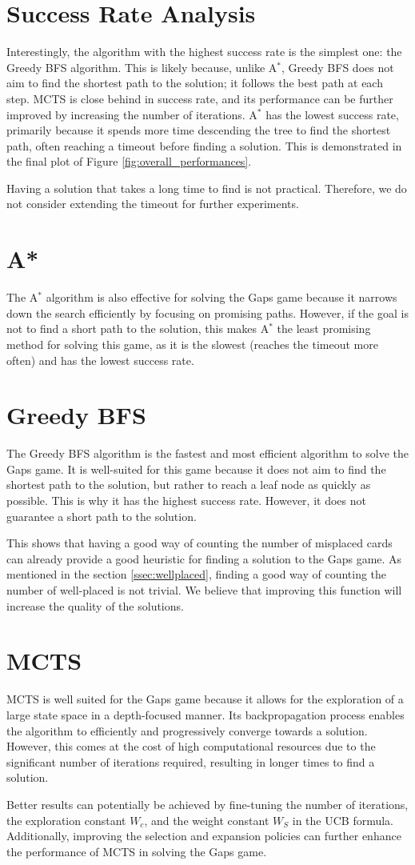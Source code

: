 \section{Success Rate Analysis}
Interestingly, the algorithm with the highest success rate is the simplest one: the Greedy BFS algorithm. This is likely because, unlike A$^*$, Greedy BFS does not aim to find the shortest path to the solution; it follows the best path at each step. MCTS is close behind in success rate, and its performance can be further improved by increasing the number of iterations. A$^*$ has the lowest success rate, primarily because it spends more time descending the tree to find the shortest path, often reaching a timeout before finding a solution. This is demonstrated in the final plot of Figure \ref{fig:overall_performances}.

Having a solution that takes a long time to find is not practical. Therefore, we do not consider extending the timeout for further experiments.

\section{A*}
The A$^*$ algorithm is also effective for solving the Gaps game because it narrows down the search efficiently by focusing on promising paths. However, if the goal is not to find a short path to the solution, this makes A$^*$ the least promising method for solving this game, as it is the slowest (reaches the timeout more often) and has the lowest success rate.

\section{Greedy BFS}
The Greedy BFS algorithm is the fastest and most efficient algorithm to solve the Gaps game. It is well-suited for this game because it does not aim to find the shortest path to the solution, but rather to reach a leaf node as quickly as possible. This is why it has the highest success rate. However, it does not guarantee a short path to the solution.

This shows that having a good way of counting the number of misplaced cards can already provide a good heuristic for finding a solution to the Gaps game. As mentioned in the section \ref{ssec:wellplaced}, finding a good way of counting the number of well-placed is not trivial. We believe that improving this function will increase the quality of the solutions.

\section{MCTS}
MCTS is well suited for the Gaps game because it allows for the exploration of a large state space in a depth-focused manner. Its backpropagation process enables the algorithm to efficiently and progressively converge towards a solution. However, this comes at the cost of high computational resources due to the significant number of iterations required, resulting in longer times to find a solution.

Better results can potentially be achieved by fine-tuning the number of iterations, the exploration constant $W_c$, and the weight constant $W_S$ in the UCB formula. Additionally, improving the selection and expansion policies can further enhance the performance of MCTS in solving the Gaps game.


